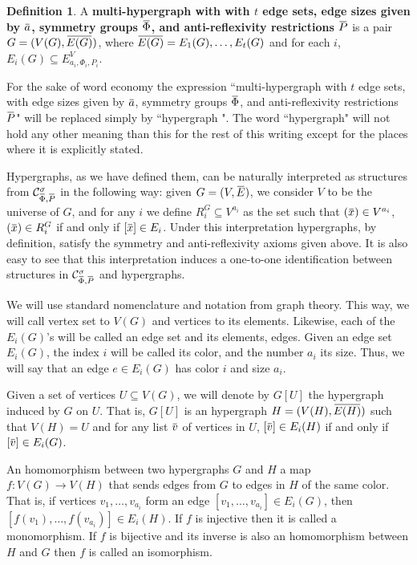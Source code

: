 \documentclass[12pt,notitlepage,a4paper]{article}
\theoremstyle{definition}
\newtheorem{definition}{Definition}[section]
\newcommand{\overbar}[1]{\mkern 1.5mu\overline{\mkern-1.5mu#1\mkern-1.5mu}\mkern 1.5mu}
\begin{document}
\begin{definition} 
A \textbf{ multi-hypergraph with
with $t$ edge sets, edge sizes given by
$\overbar{a}$,
symmetry groups $\overbar{\Phi}$, 
and anti-reflexivity restrictions $\overbar{P}$}
is a pair $G=(V(G),\overbar{E(G)})$,
where $\overbar{E(G)}=E_1(G),\dots, E_t(G)$ and
for each $i$, $E_i(G) \subseteq E^{V}_{a_i,\Phi_i,P_i}$.
\end{definition}

For the sake of word economy the expression 
``multi-hypergraph with
$t$ edge sets, with edge sizes given by $\overbar{a}$,
symmetry groups $\overbar{\Phi}$, and anti-reflexivity 
restrictions $\overbar{P}$" 
will be replaced simply by ``hypergraph ". The word 
``hypergraph" will not hold
any other meaning than this for the rest 
of this writing except for the places
where it is explicitly stated.  \par

Hypergraphs, as we have defined them, 
can be naturally interpreted as
structures from $\mathcal{C}^
{\sigma}_{\overbar{\Phi},\overbar{P}}$ 
in the following way: 
given $G=(V,\overbar{E})$,
we consider $V$ to be the universe of
 $G$, and for any $i$ we define
$R_i^G\subseteq V^{a_i}$ as the set such that
$(\overbar{x})\in V^{a_i}$, 
$(\overbar{x})\in R_i^G$ if and only if 
$[\overbar{x}]\in E_i$. Under 
this interpretation hypergraphs, by definition,
satisfy the symmetry and anti-reflexivity
axioms given above. It is also easy to
see that this interpretation induces
a one-to-one identification between 
structures in $\mathcal{C}^{\sigma}_{\overbar{\Phi}
,\overbar{P}}$ and hypergraphs. \par

We will use standard nomenclature and notation
from graph theory. This way, we will call vertex set
to $V(G)$ and vertices to its elements. Likewise, each of 
the $E_i(G)$'s will be called an edge set and its elements, 
edges. Given an edge set $E_i(G)$, the index $i$ will
be called its color, and the number
$a_i$ its size. Thus, we will say that
an edge $e\in E_i(G)$ has color $i$ and size
$a_i$. 

Given a set of vertices $U\subseteq V(G)$, 
we will denote by $G[U]$ the hypergraph induced
by $G$ on $U$. That is, $G[U]$ is an hypergraph
$H=(V(H),\overbar{E(H)})$ such that $V(H)=U$ and
for any list $\overbar{v}$ of vertices in $U$,
$[\overbar{v}]\in E_i(H)$ if and only if 
$[\overbar{v}]\in E_i(G)$.
\par

An homomorphism between two hypergraphs $G$ and $H$ 
a map $f:V(G)\rightarrow V(H)$ that sends edges 
from $G$ to edges in $H$ of the same color. That is,
if vertices $v_1,\dots, v_{a_i}$ form an edge 
$[v_1,\dots,v_{a_i}]\in E_i(G)$, then
$[f(v_1),\dots,f(v_{a_i})]\in E_i(H)$.
If $f$ is injective then it is called a monomorphism. 
If $f$ is bijective and its inverse is also an homomorphism 
between $H$ and $G$ then $f$ is called an isomorphism.\par
\end{document}
